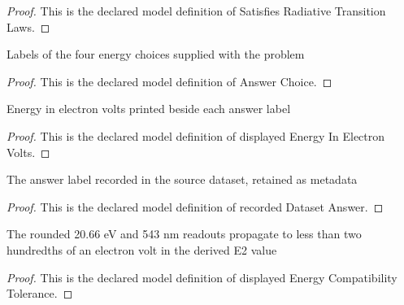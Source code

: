 \begin{proof}
  This is the declared model definition of Satisfies Radiative Transition Laws.
\end{proof}
\begin{definition}
  \label{def:physics:phyx-mini-0537:phyxminiproblems-problemphyxmini0537-answerchoice}
  Labels of the four energy choices supplied with the problem
\end{definition}
\begin{proof}
  This is the declared model definition of Answer Choice.
\end{proof}
\begin{definition}
  \label{def:physics:phyx-mini-0537:phyxminiproblems-problemphyxmini0537-displayedenergyinelectronvolts}
  Energy in electron volts printed beside each answer label
\end{definition}
\begin{proof}
  This is the declared model definition of displayed Energy In Electron Volts.
\end{proof}
\begin{definition}
  \label{def:physics:phyx-mini-0537:phyxminiproblems-problemphyxmini0537-recordeddatasetanswer}
  The answer label recorded in the source dataset, retained as metadata
\end{definition}
\begin{proof}
  This is the declared model definition of recorded Dataset Answer.
\end{proof}
\begin{definition}
  \label{def:physics:phyx-mini-0537:phyxminiproblems-problemphyxmini0537-displayedenergycompatibilitytolerance}
  The rounded 20.66 eV and 543 nm readouts propagate to less than two hundredths of an electron volt in the derived E2 value
\end{definition}
\begin{proof}
  This is the declared model definition of displayed Energy Compatibility Tolerance.
\end{proof}
